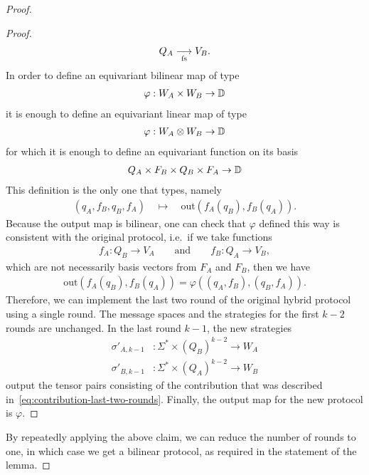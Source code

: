 \begin{proof}
\begin{proof}
        \begin{align*}
        Q_A \underset{\text{fs}}{\longrightarrow} V_B.
        \end{align*}
        In order to define an equivariant bilinear map of type
        \begin{align*}
        \varphi : W_A \times W_B \to \mathbb D
        \end{align*}
        it is enough to define an equivariant linear map of type 
        \begin{align*}
        \varphi : W_A \otimes W_B \to \mathbb D
        \end{align*}
        for which it is enough to define an equivariant function on its basis
        \begin{align*}
        Q_A \times F_B \times Q_B \times F_A \to \mathbb D
        \end{align*}
        This definition is the only one that types, namely 
        \begin{align*}
        (q_A, f_B, q_B, f_A) \quad 
        \mapsto \quad 
        \text{out}(f_A(q_B), f_B(q_A)).
        \end{align*}
        Because the output map is bilinear, one can check that $\varphi$ defined this way is consistent with the original protocol, i.e.~if we take functions 
        \begin{align*}
        f_A : Q_B \to V_A \qquad \text{and} \qquad f_B : Q_A \to V_B,
        \end{align*}
        which are not necessarily basis vectors from $F_A$ and $F_B$, then we have 
        \begin{align*}
        \text{out}(f_A(q_B), f_B(q_A)) = \varphi((q_A, f_B), (q_B, f_A)).
        \end{align*}
        Therefore, we can implement the last two round of the original hybrid protocol using a single round. The message spaces and the strategies for the first $k-2$ rounds are unchanged. In the last round $k-1$, the new strategies
        \begin{align*}
        \sigma'_{A,k-1} & : \Sigma^* \times (Q_B)^{k-2} \to W_A\\
        \sigma'_{B,k-1} & : \Sigma^* \times (Q_A)^{k-2} \to W_B
        \end{align*}
        output the tensor pairs consisting of the contribution that was described in~\eqref{eq:contribution-last-two-rounds}. Finally, the output  map for the new protocol is $\varphi$. 
    \end{proof}

    By repeatedly applying the above claim, we can reduce the number of rounds to one, in which case we get a bilinear protocol, as required in the statement of the lemma. 
\end{proof}


